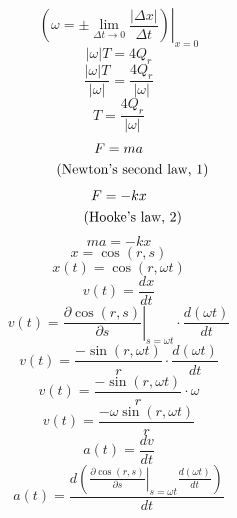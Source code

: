\documentclass[a4paper,12pt]{report}
\newcommand{\equationnote}[1]{%
    \refstepcounter{equation}%
    \tag{#1, \theequation}%
}
\begin{document}
\begin{equation}
\left.\left(\omega = \pm \lim \limits_{\Delta t \to 0} \frac{|\Delta x|}{\Delta t}\right)\right|_{x=0}
\end{equation}
\begin{equation}
|\omega| T = 4Q_r
\end{equation}
\begin{equation}
\frac{|\omega| T}{|\omega|} = \frac{4Q_r}{|\omega|}
\end{equation}
\begin{equation}
T = \frac{4Q_r}{|\omega|}
\end{equation}
\begin{gather}
F = ma \notag \\
\equationnote{Newton's second law}
\end{gather}
\begin{gather}
F = -kx \notag \\
\equationnote{Hooke's law}
\end{gather}
\begin{equation}
ma = -kx
\end{equation}
\begin{equation}
x = \cos(r,s)
\end{equation}
\begin{equation}
x(t) = \cos(r,\omega t)
\end{equation}
\begin{equation}
v(t) = \frac{dx}{dt}
\end{equation}
\begin{equation}
v(t) = \left.\frac{\partial \cos(r,s)}{\partial s}\right|_{s = \omega t} \cdot \frac{d (\omega t)}{dt}
\end{equation}
\begin{equation}
v(t) = \frac{-\sin(r,\omega t)}{r} \cdot \frac{d (\omega t)}{dt}
\end{equation}
\begin{equation}
v(t) = \frac{-\sin(r,\omega t)}{r} \cdot \omega
\end{equation}
\begin{equation}
v(t) = \frac{-\omega \sin(r,\omega t)}{r}
\end{equation}
\begin{equation}
a(t) = \frac{dv}{dt}
\end{equation}
\begin{equation}
a(t) = \frac{d \left(\left.\frac{\partial \cos(r,s)}{\partial s}\right|_{s = \omega t} \frac{d (\omega t)}{dt}\right)}{dt}
\end{equation}
\end{document}
